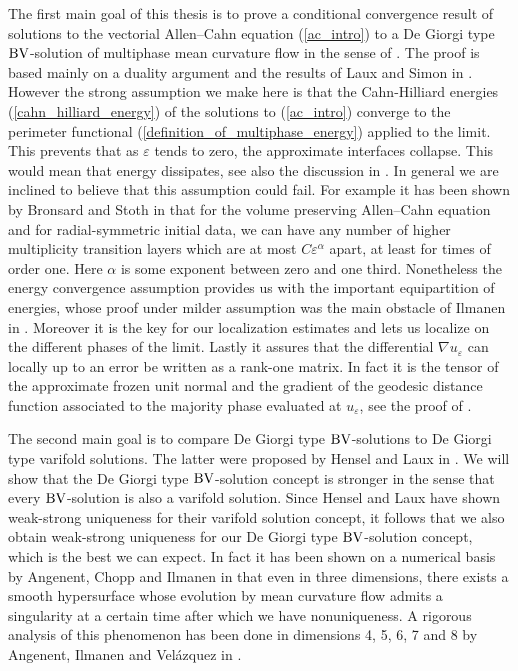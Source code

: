 The first main goal of this thesis is to prove a conditional convergence result 
of solutions to the vectorial Allen--Cahn equation (\ref{ac_intro}) to a De 
Giorgi type $ \operatorname{BV} $-solution of multiphase mean curvature flow in the sense of 
. The proof is based mainly on a duality 
argument and the results of Laux and Simon in 
\cite{convergence_of_allen_cahn_equation_to_multiphase_mean_curvature_flow}.
However the strong assumption we make here is that the Cahn-Hilliard energies 
(\ref{cahn_hilliard_energy}) of the solutions to (\ref{ac_intro}) converge to 
the perimeter functional (\ref{definition_of_multiphase_energy}) applied to the 
limit. 
This prevents that as $ \varepsilon $ tends to zero, the approximate interfaces 
collapse. This would mean that energy dissipates, see also the discussion in
.  In general we are 
inclined to believe that this assumption could fail. For example it has been 
shown by Bronsard and Stoth in 
\cite{bronsard_stoth_on_the_existence_of_high_multiplicity_interfaces}
that for the volume preserving Allen--Cahn equation and for radial-symmetric 
initial data, we can have any number of higher 
multiplicity transition layers which are at most $ C \varepsilon^{ \alpha } $ 
apart, at least for times of order one.
Here $ \alpha $ is some exponent between zero and one third.
Nonetheless the energy 
convergence assumption provides us with the important equipartition of 
energies, whose proof under milder assumption was the main obstacle of Ilmanen 
in \cite{ilmanen_convergence_of_ac_to_brakkes_mcf}. Moreover it is the key for 
our localization estimates and lets us localize on the different phases of the 
limit. Lastly it assures that the differential $ \nabla u_{ 
\varepsilon } $ can locally up to an error be written as a rank-one matrix. In 
fact it
is the tensor of the approximate frozen unit normal and the gradient of the 
geodesic 
distance function associated to the majority phase evaluated at $ u_{ 
\varepsilon } $, see the proof of .

The second main goal is to compare De Giorgi type $ \operatorname{BV} $-solutions to De 
Giorgi type varifold solutions.
The latter were 
proposed by Hensel and Laux in 
\cite{hensel_laux_varifold_solution_concept_for_mean_curvature_flow}. We will 
show that the De Giorgi type $ \operatorname{BV} $-solution concept is stronger in the sense 
that every $ \operatorname{BV} 
$-solution is also a varifold solution. 
Since Hensel and Laux have shown 
weak-strong uniqueness for their varifold solution concept, it follows that we 
also obtain weak-strong uniqueness for our De Giorgi type $ \operatorname{BV} $-solution 
concept, which is the best we can expect. 
In fact it has been shown on a 
numerical basis by Angenent, Chopp and Ilmanen in 
\cite{angenent_chopp_ilmanen_a_computed_example_of_nonuniqueness_of_mcf}
that even in three dimensions, there exists a smooth hypersurface whose 
evolution by 
mean curvature 
flow admits a singularity at a certain time after which we have nonuniqueness. 
A rigorous analysis of this phenomenon has been done in dimensions 4, 5, 6, 7 
and 8 by Angenent, Ilmanen and Velázquez in 
\cite{angenent_ilmanen_velázquez_fattening_from_smooth_initial_data_in_mcf}.

